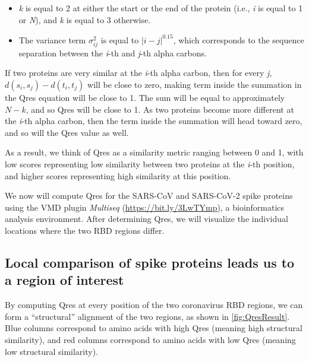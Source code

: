 \begin{itemize}
	\item \textit{k} is equal to 2 at either the start or the end of the protein (i.e., \textit{i} is equal to 1 or \textit{N}), and \textit{k} is equal to 3 otherwise.
	\item The variance term $\sigma_{ij}^2$ is equal to $\left\lvert{i-j}\right\rvert ^{0.15}$, which corresponds to the sequence separation between the \textit{i}-th and \textit{j}-th alpha carbons.
\end{itemize}

\begin{note}\end{note}

If two proteins are very similar at the \textit{i}-th alpha carbon, then for every \textit{j}, $d(s_{i}, s_{j}) - d(t_{i}, t_{j})$ will be close to zero, making term inside the summation in the Qres equation will be close to 1. The sum will be equal to approximately $N - k$, and so Qres will be close to 1. As two proteins become more different at the \textit{i}-th alpha carbon, then the term inside the summation will head toward zero, and so will the Qres value as well.

As a result, we think of Qres as a similarity metric ranging between 0 and 1, with low scores representing low similarity between two proteins at the \textit{i}-th position, and higher scores representing high similarity at this position.

We now will compute Qres for the SARS-CoV and SARS-CoV-2 spike proteins using the VMD plugin \textit{Multiseq} (\url{https://bit.ly/3LwTYmp}), a bioinformatics analysis environment. After determining Qres, we will visualize the individual locations where the two RBD regions differ. 

\FloatBarrier
{}
\subsection{Local comparison of spike proteins leads us to a region of interest}

By computing Qres at every position of the two coronavirus RBD regions, we can form a ``structural'' alignment of the two regions, as shown in \autoref{fig:QresResult}. Blue columns correspond to amino acids with high Qres (meaning high structural similarity), and red columns correspond to amino acids with low Qres (meaning low structural similarity).

